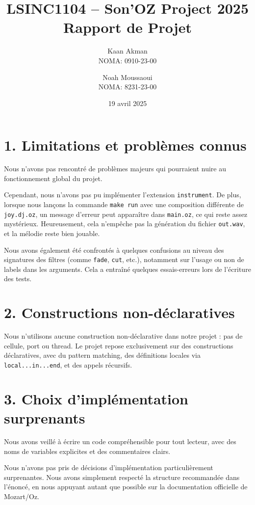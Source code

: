 \documentclass[a4paper,11pt]{article}
\title{\textbf{LSINC1104 – Son’OZ Project 2025}\\Rapport de Projet}
\author{
  Kaan Akman\\
  NOMA: 0910-23-00
  \and
  Noah Moussaoui\\
  NOMA: 8231-23-00
}
\date{19 avril 2025}
\begin{document}
\maketitle

\section*{1. Limitations et problèmes connus}

Nous n’avons pas rencontré de problèmes majeurs qui pourraient nuire au fonctionnement global du projet.

Cependant, nous n’avons pas pu implémenter l’extension \texttt{instrument}. De plus, lorsque nous lançons la commande \texttt{make run} avec une composition différente de \texttt{joy.dj.oz}, un message d’erreur peut apparaître dans \texttt{main.oz}, ce qui reste assez mystérieux. Heureusement, cela n’empêche pas la génération du fichier \texttt{out.wav}, et la mélodie reste bien jouable.

Nous avons également été confrontés à quelques confusions au niveau des signatures des filtres (comme \texttt{fade}, \texttt{cut}, etc.), notamment sur l’usage ou non de labels dans les arguments. Cela a entraîné quelques essais-erreurs lors de l’écriture des tests.

\section*{2. Constructions non-déclaratives}

Nous n’utilisons aucune construction non-déclarative dans notre projet : pas de cellule, port ou thread. Le projet repose exclusivement sur des constructions déclaratives, avec du pattern matching, des définitions locales via \texttt{local...in...end}, et des appels récursifs.

\section*{3. Choix d’implémentation surprenants}

Nous avons veillé à écrire un code compréhensible pour tout lecteur, avec des noms de variables explicites et des commentaires clairs.

Nous n'avons pas pris de décisions d’implémentation particulièrement surprenantes. Nous avons simplement respecté la structure recommandée dans l’énoncé, en nous appuyant autant que possible sur la documentation officielle de Mozart/Oz.
\end{document}
